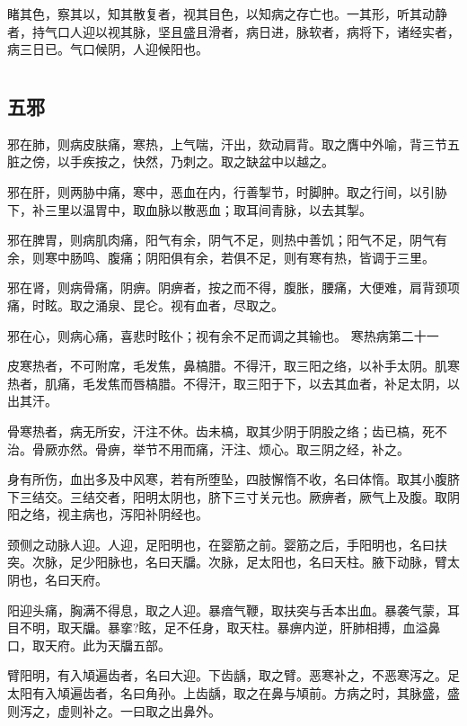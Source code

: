 \documentclass[a4paper,12pt,UTF8,twoside]{ctexbook}
\begin{document}
	睹其色，察其以，知其散复者，视其目色，以知病之存亡也。一其形，听其动静者，持气口人迎以视其脉，坚且盛且滑者，病日进，脉软者，病将下，诸经实者，病三日已。气口候阴，人迎候阳也。
	
	\part{}
	\chapter{五邪}
	
	邪在肺，则病皮肤痛，寒热，上气喘，汗出，欬动肩背。取之膺中外喻，背三节五脏之傍，以手疾按之，快然，乃刺之。取之缺盆中以越之。
	
	邪在肝，则两胁中痛，寒中，恶血在内，行善掣节，时脚肿。取之行间，以引胁下，补三里以温胃中，取血脉以散恶血；取耳间青脉，以去其掣。
	
	邪在脾胃，则病肌肉痛，阳气有余，阴气不足，则热中善饥；阳气不足，阴气有余，则寒中肠鸣、腹痛；阴阳俱有余，若俱不足，则有寒有热，皆调于三里。
	
	邪在肾，则病骨痛，阴痹。阴痹者，按之而不得，腹胀，腰痛，大便难，肩背颈项痛，时眩。取之涌泉、昆仑。视有血者，尽取之。
	
	邪在心，则病心痛，喜悲时眩仆；视有余不足而调之其输也。
	寒热病第二十一
	
	皮寒热者，不可附席，毛发焦，鼻槁腊。不得汗，取三阳之络，以补手太阴。肌寒热者，肌痛，毛发焦而唇槁腊。不得汗，取三阳于下，以去其血者，补足太阴，以出其汗。
	
	骨寒热者，病无所安，汗注不休。齿未槁，取其少阴于阴股之络；齿已槁，死不治。骨厥亦然。骨痹，举节不用而痛，汗注、烦心。取三阴之经，补之。
	
	身有所伤，血出多及中风寒，若有所堕坠，四肢懈惰不收，名曰体惰。取其小腹脐下三结交。三结交者，阳明太阴也，脐下三寸关元也。厥痹者，厥气上及腹。取阴阳之络，视主病也，泻阳补阴经也。
	
	颈侧之动脉人迎。人迎，足阳明也，在婴筋之前。婴筋之后，手阳明也，名曰扶突。次脉，足少阳脉也，名曰天牖。次脉，足太阳也，名曰天柱。腋下动脉，臂太阴也，名曰天府。
	
	阳迎头痛，胸满不得息，取之人迎。暴瘖气鞭，取扶突与舌本出血。暴袭气蒙，耳目不明，取天牖。暴挛?眩，足不任身，取天柱。暴痹内逆，肝肺相搏，血溢鼻口，取天府。此为天牖五部。
	
	臂阳明，有入頄遍齿者，名曰大迎。下齿龋，取之臂。恶寒补之，不恶寒泻之。足太阳有入頄遍齿者，名曰角孙。上齿龋，取之在鼻与頄前。方病之时，其脉盛，盛则泻之，虚则补之。一曰取之出鼻外。
	
\end{document}

